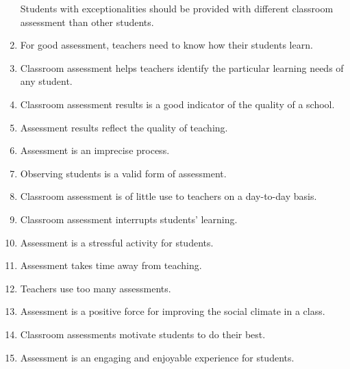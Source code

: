 \documentclass[
]{book}
\begin{document}
\begin{enumerate}
  Students with exceptionalities should be provided with different classroom assessment than other students.
\item
  For good assessment, teachers need to know how their students learn.
\item
  Classroom assessment helps teachers identify the particular learning needs of any student.
\item
  Classroom assessment results is a good indicator of the quality of a school.
\item
  Assessment results reflect the quality of teaching.
\item
  Assessment is an imprecise process.
\item
  Observing students is a valid form of assessment.
\item
  Classroom assessment is of little use to teachers on a day-to-day basis.
\item
  Classroom assessment interrupts students' learning.
\item
  Assessment is a stressful activity for students.
\item
  Assessment takes time away from teaching.
\item
  Teachers use too many assessments.
\item
  Assessment is a positive force for improving the social climate in a class.
\item
  Classroom assessments motivate students to do their best.
\item
  Assessment is an engaging and enjoyable experience for students.
\end{enumerate}

  
\end{document}
